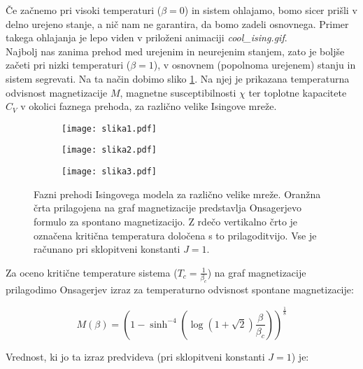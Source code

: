 \documentclass[a4paper]{article}
\begin{document}
    Če začnemo pri visoki temperaturi ($\beta = 0$) in sistem ohlajamo, bomo sicer prišli v delno urejeno stanje,
    a nič nam ne garantira, da bomo zadeli osnovnega.
    Primer takega ohlajanja je lepo viden v priloženi animaciji \textit{cool\_ising.gif}.\\

    Najbolj nas zanima prehod med urejenim in neurejenim stanjem, zato je boljše začeti pri nizki temperaturi
    ($\beta = 1$), v osnovnem (popolnoma urejenem) stanju in sistem segrevati.
    Na ta način dobimo sliko \ref{slika1}.
    Na njej je prikazana temperaturna odvisnost magnetizacije $M$, magnetne susceptibilnosti $\chi$ ter toplotne
    kapacitete $C_V$ v okolici faznega prehoda, za različno velike Isingove mreže.

    \begin{figure}
        \centering
        \begin{subfigure}{\textwidth}
            \texttt{[image: slika1.pdf]}
            \caption{}
        \end{subfigure}
        \begin{subfigure}{\textwidth}
            \texttt{[image: slika2.pdf]}
            \caption{}
        \end{subfigure}
        \begin{subfigure}{\textwidth}
            \texttt{[image: slika3.pdf]}
            \caption{}
        \end{subfigure}
        \caption{Fazni prehodi Isingovega modela za različno velike mreže.
        Oranžna črta prilagojena na graf magnetizacije predstavlja Onsagerjevo formulo za spontano magnetizacijo.
        Z rdečo vertikalno črto je označena kritična temperatura določena s to prilagoditvijo.
        Vse je računano pri sklopitveni konstanti $J = 1$.}
        \label{slika1}
    \end{figure}

    Za oceno kritične temperature sistema ($T_c = \frac{1}{\beta_c}$) na graf magnetizacije prilagodimo Onsagerjev
    izraz za temperaturno odvisnost spontane magnetizacije:

    \begin{equation}\label{eq8}
        M(\beta) = \left( 1 - \sinh^{-4} \left( \log(1 + \sqrt{2}) \frac{\beta}{\beta_c} \right) \right)^{\frac{1}{8}}
    \end{equation}

    Vrednost, ki jo ta izraz predvideva (pri sklopitveni konstanti $J = 1$) je:
\end{document}
